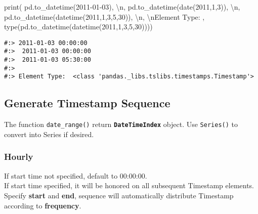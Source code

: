 \documentclass[
]{book}
\newenvironment{Shaded}{\begin{snugshade}}{\end{snugshade}}
\newcommand{\BuiltInTok}[1]{#1}
\newcommand{\CharTok}[1]{\textcolor[rgb]{0.5,0.5,0.5}{#1}}
\newcommand{\DecValTok}[1]{\textcolor[rgb]{0.06,0.06,0.06}{#1}}
\newcommand{\NormalTok}[1]{#1}
\newcommand{\StringTok}[1]{\textcolor[rgb]{0.5,0.5,0.5}{#1}}
\begin{document}
\begin{Shaded}
\begin{Highlighting}[]
\BuiltInTok{print}\NormalTok{( pd.to\_datetime(}\StringTok{\textquotesingle{}2011{-}01{-}03\textquotesingle{}}\NormalTok{), }\StringTok{\textquotesingle{}}\CharTok{\textbackslash{}n}\StringTok{\textquotesingle{}}\NormalTok{,}
\NormalTok{       pd.to\_datetime(date(}\DecValTok{2011}\NormalTok{,}\DecValTok{1}\NormalTok{,}\DecValTok{3}\NormalTok{)), }\StringTok{\textquotesingle{}}\CharTok{\textbackslash{}n}\StringTok{\textquotesingle{}}\NormalTok{,}
\NormalTok{       pd.to\_datetime(datetime(}\DecValTok{2011}\NormalTok{,}\DecValTok{1}\NormalTok{,}\DecValTok{3}\NormalTok{,}\DecValTok{5}\NormalTok{,}\DecValTok{30}\NormalTok{)), }\StringTok{\textquotesingle{}}\CharTok{\textbackslash{}n}\StringTok{\textquotesingle{}}\NormalTok{,}
       \StringTok{\textquotesingle{}}\CharTok{\textbackslash{}n}\StringTok{Element Type: \textquotesingle{}}\NormalTok{, }\BuiltInTok{type}\NormalTok{(pd.to\_datetime(datetime(}\DecValTok{2011}\NormalTok{,}\DecValTok{1}\NormalTok{,}\DecValTok{3}\NormalTok{,}\DecValTok{5}\NormalTok{,}\DecValTok{30}\NormalTok{))))}
\end{Highlighting}
\end{Shaded}

\begin{verbatim}
#:> 2011-01-03 00:00:00 
#:>  2011-01-03 00:00:00 
#:>  2011-01-03 05:30:00 
#:>  
#:> Element Type:  <class 'pandas._libs.tslibs.timestamps.Timestamp'>
\end{verbatim}

\hypertarget{generate-timestamp-sequence}{%
\subsection{Generate Timestamp Sequence}\label{generate-timestamp-sequence}}

The function \texttt{date\_range()} return \textbf{\texttt{DateTimeIndex}} object. Use \texttt{Series()} to convert into Series if desired.

\hypertarget{hourly}{%
\subsubsection{Hourly}\label{hourly}}

If start time not specified, default to 00:00:00.\\
If start time specified, it will be honored on all subsequent Timestamp elements.\\
Specify \textbf{start} and \textbf{end}, sequence will automatically distribute Timestamp according to \textbf{frequency}.
\end{document}
